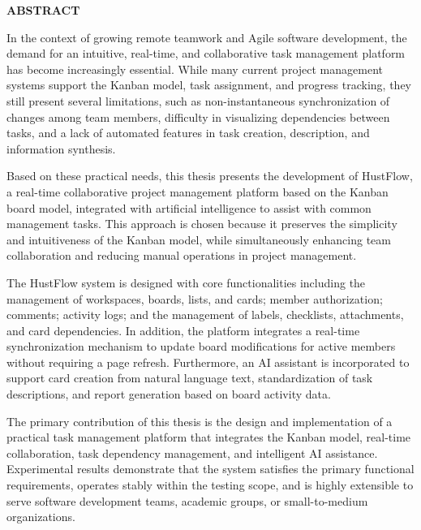 \documentclass[../DoAn.tex]{subfiles}
\begin{document}
\begin{center}
    \Large{\textbf{ABSTRACT}}\\
\end{center}
\vspace{1cm}
\hspace*{13pt} In the context of growing remote teamwork and Agile software development, the demand for an intuitive, real-time, and collaborative task management platform has become increasingly essential. While many current project management systems support the Kanban model, task assignment, and progress tracking, they still present several limitations, such as non-instantaneous synchronization of changes among team members, difficulty in visualizing dependencies between tasks, and a lack of automated features in task creation, description, and information synthesis.

Based on these practical needs, this thesis presents the development of HustFlow, a real-time collaborative project management platform based on the Kanban board model, integrated with artificial intelligence to assist with common management tasks. This approach is chosen because it preserves the simplicity and intuitiveness of the Kanban model, while simultaneously enhancing team collaboration and reducing manual operations in project management.

The HustFlow system is designed with core functionalities including the management of workspaces, boards, lists, and cards; member authorization; comments; activity logs; and the management of labels, checklists, attachments, and card dependencies. In addition, the platform integrates a real-time synchronization mechanism to update board modifications for active members without requiring a page refresh. Furthermore, an AI assistant is incorporated to support card creation from natural language text, standardization of task descriptions, and report generation based on board activity data.

The primary contribution of this thesis is the design and implementation of a practical task management platform that integrates the Kanban model, real-time collaboration, task dependency management, and intelligent AI assistance. Experimental results demonstrate that the system satisfies the primary functional requirements, operates stably within the testing scope, and is highly extensible to serve software development teams, academic groups, or small-to-medium organizations.
\end{document}
